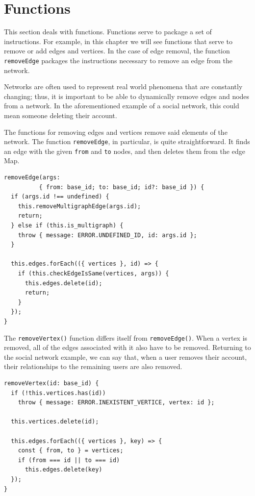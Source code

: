 \chapter{Functions}

This section deals with functions.
Functions serve to package a set of instructions.
For example, in this chapter we will see functions that serve
to remove or add edges and vertices.
In the case of edge removal, the function
\texttt{removeEdge} packages the instructions
necessary to remove an edge from the network.

Networks are often used to represent real world
phenomena that are constantly changing; thus,
it is important to be able to dynamically remove
edges and nodes from a network.
In the aforementioned example of a social network,
this could mean someone deleting their account.

The functions for removing edges and vertices remove said elements of the network.
The function \texttt{removeEdge}, in particular,
is quite straightforward.
It finds an edge with the given \texttt{from} and \texttt{to} nodes,
and then deletes them from the edge Map.

\begin{verbatim}
removeEdge(args:
          { from: base_id; to: base_id; id?: base_id }) {
  if (args.id !== undefined) {
    this.removeMultigraphEdge(args.id);
    return;
  } else if (this.is_multigraph) {
    throw { message: ERROR.UNDEFINED_ID, id: args.id };
  }

  this.edges.forEach(({ vertices }, id) => {
    if (this.checkEdgeIsSame(vertices, args)) {
      this.edges.delete(id);
      return;
    }
  });
}
\end{verbatim}

The \texttt{removeVertex()} function differs itself from
\texttt{removeEdge()}.
When a vertex is removed, all of the edges associated with it also have to be removed.
Returning to the social network example, we can say that, when
a user removes their account, their relationships to the remaining
users are also removed.

\begin{verbatim}
removeVertex(id: base_id) {
  if (!this.vertices.has(id))
    throw { message: ERROR.INEXISTENT_VERTICE, vertex: id };

  this.vertices.delete(id);

  this.edges.forEach(({ vertices }, key) => {
    const { from, to } = vertices;
    if (from === id || to === id)
      this.edges.delete(key)
  });
}
\end{verbatim}

